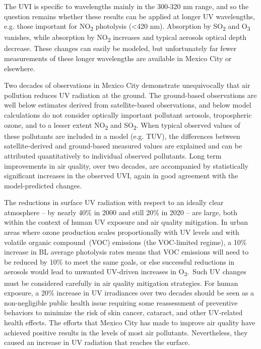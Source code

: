 \documentclass[10pt]{article}
\begin{document}
The UVI is specific to wavelengths mainly in the 300-320 nm range, and
so the question remains whether these results can be applied at longer
UV wavelengths, e.g. those important for NO\textsubscript{2} photolysis
(\textless{}420 nm). Absorption by SO\textsubscript{2} and
O\textsubscript{3} vanishes, while absorption by NO\textsubscript{2}
increases and typical aerosols optical depth decrease. These changes can
easily be modeled, but unfortunately far fewer measurements of these
longer wavelengths are available in Mexico City or elsewhere.

Two decades of observations in Mexico City demonstrate unequivocally
that air pollution reduces UV radiation at the ground. The ground-based
observations are well below estimates derived from satellite-based
observations, and below model calculations do not consider optically
important pollutant aerosols, tropospheric ozone, and to a lesser extent
NO\textsubscript{2} and SO\textsubscript{2}. When typical observed
values of these pollutants are included in a model (e.g. TUV), the
differences between satellite-derived and ground-based measured values
are explained and can be attributed quantitatively to individual
observed pollutants. Long term improvements in air quality, over two
decades, are accompanied by statistically significant increases in the
observed UVI, again in good agreement with the model-predicted changes.
~

The reductions in surface UV radiation with respect to an ideally clear
atmosphere -- by nearly 40\% in 2000 and still 20\% in 2020 -- are
large, both within the context of human UV exposure and air quality
mitigation. In urban areas where ozone production scales proportionally
with UV levels and with volatile organic compound~(VOC) emissions (the
VOC-limited regime), a 10\% increase in BL average photolysis rates
means that VOC emissions will need to be reduced by 10\% to meet the
same goals, or else successful reductions in aerosols would lead to
unwanted UV-driven increases in O\textsubscript{3}.~Such UV changes must
be considered carefully in air quality mitigation strategies. For human
exposure, a 20\% increase in UV irradiances over two decades should be
seen as a non-negligible public health issue requiring some reassessment
of preventive behaviors to minimize the risk of skin cancer, cataract,
and other UV-related health effects. The efforts that Mexico City has
made to improve air quality have achieved positive results in the levels
of most air pollutants. Nevertheless, they caused an increase in UV
radiation that reaches the surface.
\end{document}
